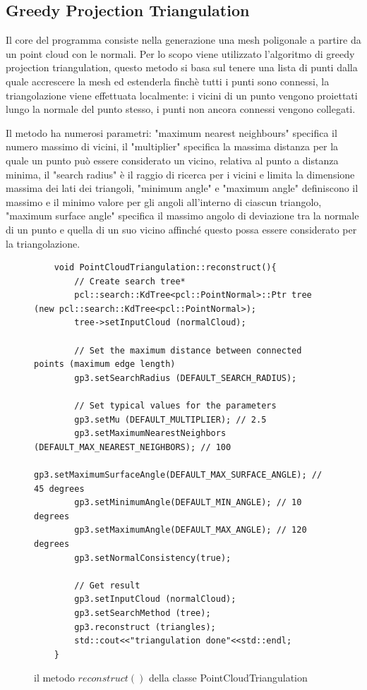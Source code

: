 \documentclass[a4paper,12pt]{article}
\begin{document}
	\subsection{Greedy Projection Triangulation}
	Il core del programma consiste nella generazione una mesh poligonale a partire da un point cloud con le normali.
	Per lo scopo viene utilizzato l'algoritmo di greedy projection triangulation, questo metodo si basa sul tenere una
	lista di punti dalla quale accrescere la mesh ed estenderla finchè tutti i punti sono connessi, la triangolazione
	viene effettuata localmente: i vicini di un punto vengono proiettati lungo la normale del punto stesso, i punti non
	ancora connessi vengono collegati. 
	
	Il metodo ha numerosi parametri: "maximum nearest neighbours" specifica il numero massimo di vicini,
	il "multiplier" specifica la massima distanza per la quale un punto può essere considerato un vicino, relativa al punto
	a distanza minima, il "search radius" è il raggio di ricerca per i vicini e limita la dimensione massima dei lati dei 
	triangoli, "minimum angle" e "maximum angle" definiscono il massimo e il minimo valore per gli angoli all'interno di 
	ciascun triangolo, "maximum surface angle" specifica il massimo angolo di deviazione tra la normale di un punto e quella di
	un suo vicino affinché questo possa essere considerato per la triangolazione.
	\begin{figure}[H]
	\begin{lstlisting}
	void PointCloudTriangulation::reconstruct(){
    	// Create search tree*
    	pcl::search::KdTree<pcl::PointNormal>::Ptr tree (new pcl::search::KdTree<pcl::PointNormal>);
    	tree->setInputCloud (normalCloud);
	
    	// Set the maximum distance between connected points (maximum edge length)
    	gp3.setSearchRadius (DEFAULT_SEARCH_RADIUS);
	
    	// Set typical values for the parameters
    	gp3.setMu (DEFAULT_MULTIPLIER); // 2.5
    	gp3.setMaximumNearestNeighbors (DEFAULT_MAX_NEAREST_NEIGHBORS); // 100
    	gp3.setMaximumSurfaceAngle(DEFAULT_MAX_SURFACE_ANGLE); // 45 degrees
	    gp3.setMinimumAngle(DEFAULT_MIN_ANGLE); // 10 degrees
    	gp3.setMaximumAngle(DEFAULT_MAX_ANGLE); // 120 degrees
    	gp3.setNormalConsistency(true);

    	// Get result
    	gp3.setInputCloud (normalCloud);
    	gp3.setSearchMethod (tree);
    	gp3.reconstruct (triangles);
    	std::cout<<"triangulation done"<<std::endl;
	}
	\end{lstlisting}
	\caption{il metodo $reconstruct()$ della classe PointCloudTriangulation}
	\label{reconstruct}
	\end{figure}
\end{document}
